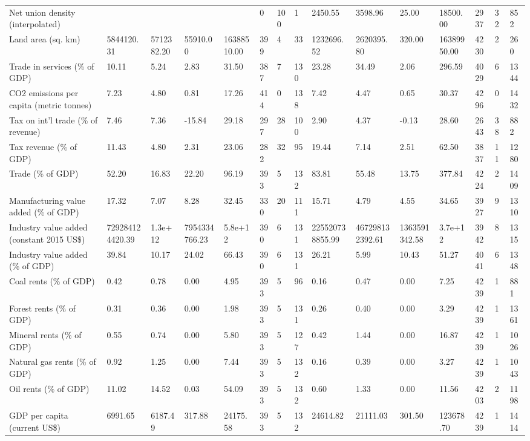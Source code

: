 \begin{longtable}{lllllllllllllll}
Net union density (interpolated) &  &  &  &  & 0 & 100 & 1 & 2450.55 & 3598.96 & 25.00 & 18500.00 & 2937 & 32 & 852\\
Land area (sq. km) & 5844120.31 & 5712382.20 & 55910.00 & 16388510.00 & 399 & 4 & 33 & 1232696.52 & 2620395.80 & 320.00 & 16389950.00 & 4230 & 2 & 260\\
\addlinespace
Trade in services (\% of GDP) & 10.11 & 5.24 & 2.83 & 31.50 & 387 & 7 & 130 & 23.28 & 34.49 & 2.06 & 296.59 & 4029 & 6 & 1344\\
CO2 emissions per capita (metric tonnes) & 7.23 & 4.80 & 0.81 & 17.26 & 414 & 0 & 138 & 7.42 & 4.47 & 0.65 & 30.37 & 4296 & 0 & 1432\\
Tax on int'l trade (\% of revenue) & 7.46 & 7.36 & -15.84 & 29.18 & 297 & 28 & 100 & 2.90 & 4.37 & -0.13 & 28.60 & 2643 & 38 & 882\\
Tax revenue (\% of GDP) & 11.43 & 4.80 & 2.31 & 23.06 & 282 & 32 & 95 & 19.44 & 7.14 & 2.51 & 62.50 & 3837 & 11 & 1280\\
Trade (\% of GDP) & 52.20 & 16.83 & 22.20 & 96.19 & 393 & 5 & 132 & 83.81 & 55.48 & 13.75 & 377.84 & 4224 & 2 & 1409\\
\addlinespace
Manufacturing value added (\% of GDP) & 17.32 & 7.07 & 8.28 & 32.45 & 330 & 20 & 111 & 15.71 & 4.79 & 4.55 & 34.65 & 3927 & 9 & 1310\\
Industry value added (constant 2015 US\$) & 729284124420.39 & 1.3e+12 & 7954334766.23 & 5.8e+12 & 390 & 6 & 131 & 225520738855.99 & 467298132392.61 & 1363591342.58 & 3.7e+12 & 3942 & 8 & 1315\\
Industry value added (\% of GDP) & 39.84 & 10.17 & 24.02 & 66.43 & 390 & 6 & 131 & 26.21 & 5.99 & 10.43 & 51.27 & 4041 & 6 & 1348\\
Coal rents (\% of GDP) & 0.42 & 0.78 & 0.00 & 4.95 & 393 & 5 & 96 & 0.16 & 0.47 & 0.00 & 7.25 & 4239 & 1 & 881\\
Forest rents (\% of GDP) & 0.31 & 0.36 & 0.00 & 1.98 & 393 & 5 & 131 & 0.26 & 0.40 & 0.00 & 3.29 & 4239 & 1 & 1361\\
\addlinespace
Mineral rents (\% of GDP) & 0.55 & 0.74 & 0.00 & 5.80 & 393 & 5 & 127 & 0.42 & 1.44 & 0.00 & 16.87 & 4239 & 1 & 1026\\
Natural gas rents (\% of GDP) & 0.92 & 1.25 & 0.00 & 7.44 & 393 & 5 & 132 & 0.16 & 0.39 & 0.00 & 3.27 & 4239 & 1 & 1043\\
Oil rents (\% of GDP) & 11.02 & 14.52 & 0.03 & 54.09 & 393 & 5 & 132 & 0.60 & 1.33 & 0.00 & 11.56 & 4203 & 2 & 1198\\
GDP per capita (current US\$) & 6991.65 & 6187.49 & 317.88 & 24175.58 & 393 & 5 & 132 & 24614.82 & 21111.03 & 301.50 & 123678.70 & 4239 & 1 & 1414\\

\end{longtable}
